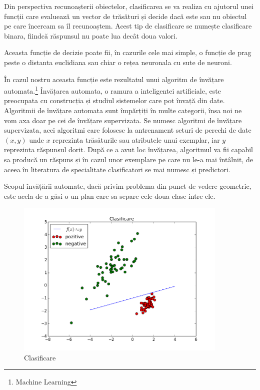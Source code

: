Din perspectiva recunoașterii obiectelor, clasificarea se va realiza cu ajutorul unei funcții care evaluează un vector de trăsături și decide dacă este sau nu obiectul pe care încercam sa îl recunoaștem. 
Acest tip de clasificare se numește clasificare binara, fiindcă răspunsul nu poate lua decât doua valori.

Aceasta funcție de decizie poate fii, în cazurile cele mai simple, o funcție de prag peste o distanta euclidiana sau chiar o rețea neuronala cu sute de neuroni.

În cazul nostru aceasta funcție este rezultatul unui algoritm de învățare automata.\footnote{Machine Learning}
Învățarea automata, o ramura a inteligentei artificiale, este preocupata cu construcția și studiul sistemelor care pot învață din date.
Algoritmii de învățare automata sunt împărțiți în multe categorii, însa noi ne vom axa doar pe cei de învățare supervizata.
Se numesc algoritmi de învățare supervizata, acei algoritmi care folosesc la antrenament seturi de perechi de date ${(x,y)}$ unde ${x}$ reprezinta trăsăturile sau atributele unui exemplar, iar ${y}$ reprezinta răspunsul dorit. 
După ce a avut loc învățarea, algoritmul va fii capabil sa producă un răspuns și în cazul unor exemplare pe care nu le-a mai întâlnit, de aceea în literatura de specialitate clasificatori se mai numesc și predictori.

Scopul învățării automate, dacă privim problema din punct de vedere geometric, este acela de a găsi o un plan care sa separe cele doua clase intre ele.

\begin{figure}[h]
	\centering
		\includegraphics[width=0.90\textwidth]{imagini/fig_clasificare.png}
	\caption{Clasificare}
	\label{fig:fig_clasificare}
\end{figure}

